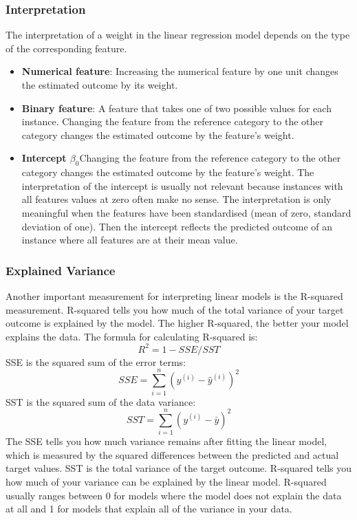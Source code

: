 \subsubsection{Interpretation}
The interpretation of a weight in the linear regression model depends on the type of the corresponding feature.
\begin{itemize}
    \item \textbf{Numerical feature}: Increasing the numerical feature by one unit changes the estimated outcome by its weight.
    \item \textbf{Binary feature}: A feature that takes one of two possible values for each instance. Changing the feature from the reference category to the other category changes the estimated outcome by the feature's weight.
    \item \textbf{Intercept $\beta_0$}Changing the feature from the reference category to the other category changes the estimated outcome by the feature's weight.
    The interpretation of the intercept is usually not relevant because instances with all features values at zero often make no sense. The interpretation is only meaningful when the features have been standardised (mean of zero, standard deviation of one). Then the intercept reflects the predicted outcome of an instance where all features are at their mean value.
\end{itemize}

\subsubsection{Explained Variance}
Another important measurement for interpreting linear models is the R-squared measurement.
R-squared tells you how much of the total variance of your target outcome is explained by the model. The higher R-squared, the better your model explains the data. 
The formula for calculating R-squared is:
\begin{equation*}
    R^2=1-SSE/SST
\end{equation*}
SSE is the squared sum of the error terms:
\begin{equation*}
    SSE=\sum_{i=1}^n(y^{(i)}-\hat{y}^{(i)})^2
\end{equation*}
SST is the squared sum of the data variance:
\begin{equation*}
    SST=\sum_{i=1}^n(y^{(i)}-\bar{y})^2
\end{equation*}
The SSE tells you how much variance remains after fitting the linear model, which is measured by the squared differences between the predicted and actual target values.
SST is the total variance of the target outcome. R-squared tells you how much of your variance can be explained by the linear model. R-squared usually ranges between 0 
for models where the model does not explain the data at all and 1 for models that explain all of the variance in your data.\\

